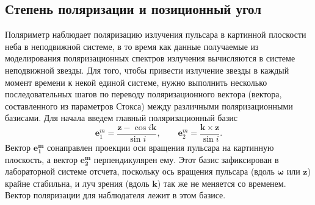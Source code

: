 \documentclass[14pt,a4paper]{extarticle}
\newcommand{\be}{\begin{equation}}
\newcommand{\ee}{\end{equation}}
\begin{document}
		\subsection{Степень поляризации и позиционный угол}\label{sub:LB}
		
			Поляриметр наблюдает поляризацию излучения пульсара в картинной плоскости неба в неподвижной системе, в то время как данные получаемые из моделирования поляризационных спектров излучения вычисляются в системе неподвижной звезды.  
			Для того, чтобы привести излучение звезды в каждый момент времени к некой единой системе, нужно выполнить несколько последовательных шагов по переводу поляризационного вектора (вектора, составленного из параметров Стокса) между различными поляризационными базисами.
			Для начала введем главный поляризационный базис
			\be 
				\label{mbasis}
				\bm{e}_1^m = \frac{\bm{z}-\cos{i} \bm{k}}{\sin{i}},\qquad 
				\bm{e}_2^m = \frac{\bm{k} \times \bm{z}}{\sin{i}}.
			\ee
			Вектор $\bm{e_1^m}$ сонаправлен проекции оси вращения пульсара на картинную плоскость, а вектор $\bm{e_2^m}$ перпендикулярен ему.
			Этот базис зафиксирован в лабораторной системе отсчета, поскольку ось вращения пульсара (вдоль $\bm{\omega}$ или $\bm{z}$) крайне стабильна, и луч зрения (вдоль $\bm{k}$) так же не меняется со временем.
			Вектор поляризации для наблюдателя лежит в этом базисе.
\end{document}
